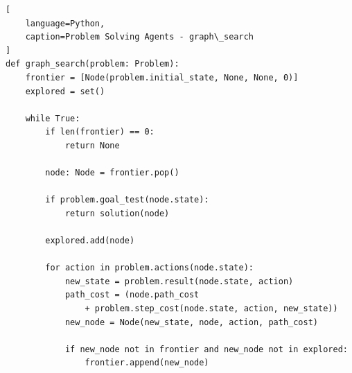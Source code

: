 \begin{algorithm}[H]
    \caption{An informal description of the general graph-search algorithm. The parts of \textsc{Graph-Search} marked in bold italic are the additions needed to handle repeated states. \cite{ai/book/Artificial-Intelligence-A-Modern-Approach/Russell-Norvig}}

\end{algorithm}

\begin{lstlisting}[
    language=Python,
    caption=Problem Solving Agents - graph\_search
]
def graph_search(problem: Problem):
    frontier = [Node(problem.initial_state, None, None, 0)]
    explored = set()

    while True:
        if len(frontier) == 0:
            return None

        node: Node = frontier.pop()

        if problem.goal_test(node.state):
            return solution(node)

        explored.add(node)

        for action in problem.actions(node.state):
            new_state = problem.result(node.state, action)
            path_cost = (node.path_cost
                + problem.step_cost(node.state, action, new_state))
            new_node = Node(new_state, node, action, path_cost)

            if new_node not in frontier and new_node not in explored:
                frontier.append(new_node)
\end{lstlisting}


